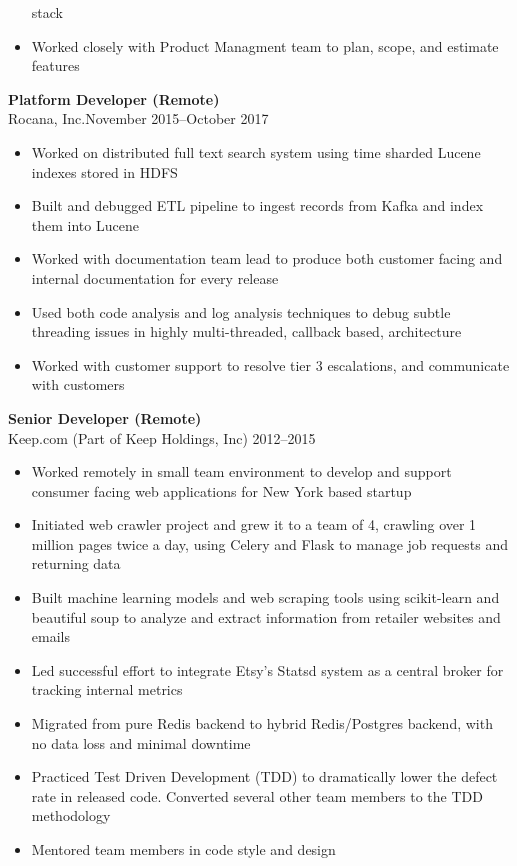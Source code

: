 \documentclass[margin]{res}
\begin{document}
\begin{resume}
\begin{itemize}
            stack
        \item Worked closely with Product Managment team to plan, scope, and
            estimate features
    \end{itemize}
{\bf Platform Developer (Remote)}\\
    Rocana, Inc.\hfill November 2015--October 2017
\begin{itemize}
    \item Worked on distributed full text search system using time sharded
        Lucene indexes stored in HDFS
    \item Built and debugged ETL pipeline to ingest records from Kafka
        and index them into Lucene
    \item Worked with documentation team lead to produce both customer facing
        and internal documentation for every release
    \item Used both code analysis and log analysis techniques to debug subtle
        threading issues in highly multi-threaded, callback based, architecture
    \item Worked with customer support to resolve tier 3 escalations, and
        communicate with customers
\end{itemize}

{\bf Senior Developer (Remote)}\\
    Keep.com (Part of Keep Holdings, Inc) \hfill 2012--2015
\begin{itemize}
  \item Worked remotely in small team environment to develop and support
      consumer facing web applications for New York based startup
  \item Initiated web crawler project and grew it to a team of 4, crawling
    over 1 million pages twice a day, using Celery and Flask to manage job
    requests and returning data
  \item Built machine learning models and web scraping tools using
    scikit-learn and beautiful soup to analyze and extract information from
    retailer websites and emails
  \item Led successful effort to integrate Etsy's Statsd system as a central
    broker for tracking internal metrics
  \item Migrated from pure Redis backend to hybrid Redis/Postgres backend,
      with no data loss and minimal downtime
  \item Practiced Test Driven Development (TDD) to dramatically lower the
      defect rate in released code.  Converted several other team members to
      the TDD methodology
  \item Mentored team members in code style and design
\end{itemize}


\end{resume}
\end{document}
